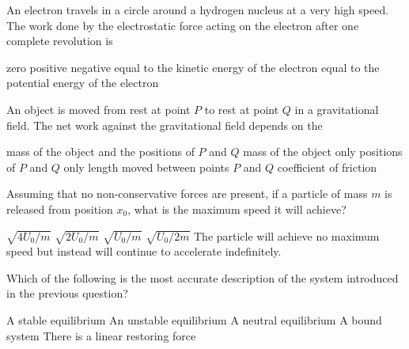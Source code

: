 \documentclass{../../../oss-classkick-exam}
\begin{document}
\begin{multicols*}{2}
\begin{questions}
    \question An electron travels in a circle around a hydrogen nucleus at a
    very high speed. The work done by the electrostatic force acting on the
    electron after one complete revolution is
    \begin{choices}
      \choice zero
      \choice positive
      \choice negative
      \choice equal to the kinetic energy of the electron
      \choice equal to the potential energy of the electron
    \end{choices}
    \vspace{.7in}
    
    \question An object is moved from rest at point $P$ to rest at point $Q$ in
    a gravitational field. The net work against the gravitational field depends
    on the
    \begin{choices}
      \choice mass of the object and the positions of $P$ and $Q$
      \choice mass of the object only
      \choice positions of $P$ and $Q$ only
      \choice length moved between points $P$ and $Q$
      \choice coefficient of friction
    \end{choices}
    \columnbreak


    \question Assuming that no non-conservative forces are present, if a
    particle of mass $m$ is released from position $x_0$, what is the maximum
    speed it will achieve?
    \label{q:well1}
    \begin{choices}
      \choice $\sqrt{4U_0/m}$
      \choice $\sqrt{2U_0/m}$
      \choice $\sqrt{U_0/m}$
      \choice $\sqrt{U_0/2m}$
      \choice The particle will achieve no maximum speed but instead will
      continue to accelerate indefinitely.
    \end{choices}
    \vspace{.7in}
    
    \question Which of the following is the most accurate description of the
    system introduced in the previous question?
    \label{q:well2}
    \begin{choices}
      \choice A stable equilibrium
      \choice An unstable equilibrium
      \choice A neutral equilibrium
      \choice A bound system
      \choice There is a linear restoring force
    \end{choices}
    \vspace{.7in}
    

\end{questions}
\end{multicols*}
\end{document}

